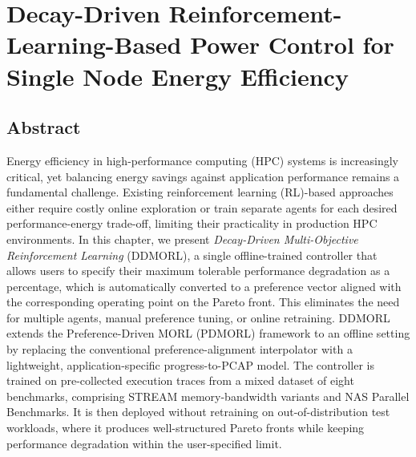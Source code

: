 

\chapter{Decay-Driven Reinforcement-Learning-Based Power Control for Single Node Energy Efficiency} \label{CH5_ICS}

\graphicspath{{Papers/ICS2026/}}
\normalsize\doublespacing

\section*{Abstract}
Energy efficiency in high-performance computing (HPC) systems is increasingly
critical, yet balancing energy savings against application performance remains a
fundamental challenge. Existing reinforcement learning (RL)-based approaches either
require costly online exploration or train separate agents for each desired
performance-energy trade-off, limiting their practicality in production HPC
environments. In this chapter, we present \textit{Decay-Driven Multi-Objective
Reinforcement Learning} (DDMORL), a single offline-trained controller that allows
users to specify their maximum tolerable performance degradation as a percentage,
which is automatically converted to a preference vector aligned with the
corresponding operating point on the Pareto front. This eliminates the need for
multiple agents, manual preference tuning, or online retraining. DDMORL extends
the Preference-Driven MORL (PDMORL) framework to an offline setting by replacing
the conventional preference-alignment interpolator with a lightweight,
application-specific progress-to-PCAP model. The controller is trained on
pre-collected execution traces from a mixed dataset of eight benchmarks, comprising
STREAM memory-bandwidth variants and NAS Parallel Benchmarks. It is then deployed
without retraining on out-of-distribution test workloads, where it produces
well-structured Pareto fronts while keeping performance degradation within the
user-specified limit.


















